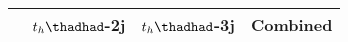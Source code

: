 \centering
\begin{tabular}{|c|c|c|c|} \hline
 & $t_h\thadhad$-2j & $t_h\thadhad$-3j & Combined\\\hline


\end{tabular}
